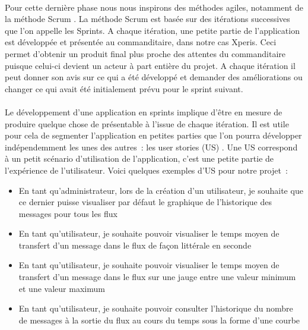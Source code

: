 			\paragraph{}%
			Pour cette dernière phase nous nous inspirons des méthodes agiles, notamment
			de la méthode Scrum \citep{aubry_scrum_2015}. La méthode Scrum est basée sur
			des itérations successives que l'on appelle les Sprints. A chaque itération, une petite
			partie de l'application est développée et présentée au commanditaire, dans
			notre cas Xperis.
			Ceci permet d'obtenir un produit final plus proche des attentes
			du commanditaire puisque celui-ci devient un acteur à part entière du
			projet. A chaque itération il peut donner son avis sur ce qui a été
			développé et demander des améliorations ou changer ce qui avait été
			initialement prévu pour le sprint suivant.
			
			\paragraph{}%
			Le développement d'une application en sprints implique d'être en mesure de
			produire quelque chose de présentable à l'issue de chaque itération.
			Il est utile pour cela de segmenter l'application en petites parties que
			l'on pourra développer indépendemment les unes des autres~: les user stories
			(US) \citep{aubry_scrum_2015}.
			Une US correspond à un petit scénario d'utilisation de
			l'application, c'est une petite partie de l'expérience de l'utilisateur.
			Voici quelques exemples d'US pour notre projet~:
			\begin{itemize}
			  \item En tant qu'administrateur, lors de la création d'un utilisateur, je
			  souhaite que ce dernier puisse visualiser par défaut le graphique de
			  l'historique des messages pour tous les flux
			  \item En tant qu'utilisateur, je souhaite pouvoir visualiser le temps moyen
			  de transfert d'un message dans le flux de façon littérale en seconde
			  \item En tant qu'utilisateur, je souhaite pouvoir visualiser le temps
			  moyen de transfert d'un message dans le flux sur une jauge entre une
			  valeur minimum et une valeur maximum
			  \item En tant qu'utilisateur, je souhaite pouvoir consulter l'historique du
			  nombre de messages à la sortie du flux au cours du temps sous la forme
			  d'une courbe
			\end{itemize}
			
